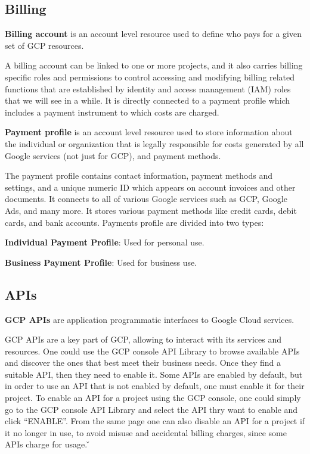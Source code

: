 \subsection{Billing}

\textbf{Billing account} is an account level resource used to define who pays for a given set of GCP resources.
\ed

A billing account can be linked to one or more projects, and it also carries billing specific roles and permissions to
control accessing and modifying billing related functions that are established by identity and access management (IAM)
roles that we will see in a while. It is directly connected to a payment profile which includes a payment instrument
to which costs are charged.

\textbf{Payment profile} is an account level resource used to store information about the individual or organization
that is legally responsible for costs generated by all Google services (not just for GCP), and payment methods.
\ed

The payment profile contains contact information, payment methods and settings, and a unique numeric ID which
appears on account invoices and other documents. It connects to all of various Google services such as GCP, Google
Ads, and many more. It stores various payment methods like credit cards, debit cards, and bank accounts. Payments
profile are divided into two types:
\bit
\item \textbf{Individual Payment Profile}: Used for personal use.
\item \textbf{Business Payment Profile}: Used for business use.
\eit

\subsection{APIs}

\textbf{GCP APIs} are application programmatic interfaces to Google Cloud services.
\ed

GCP APIs are a key part of GCP, allowing to interact with its services and resources. One could use the GCP console
API Library to browse available APIs and discover the ones that best meet their business needs. Once they find a
suitable API, then they need to enable it. Some APIs are enabled by default, but in order to use an API that is not
enabled by default, one must enable it for their project. To enable an API for a project using the GCP console, one
could simply go to the GCP console API Library and select the API thry want to enable and click ``ENABLE''. From the
same page one can also disable an API for a project if it no longer in use, to avoid misuse and accidental billing
charges, since some APIs charge for usage. \v

